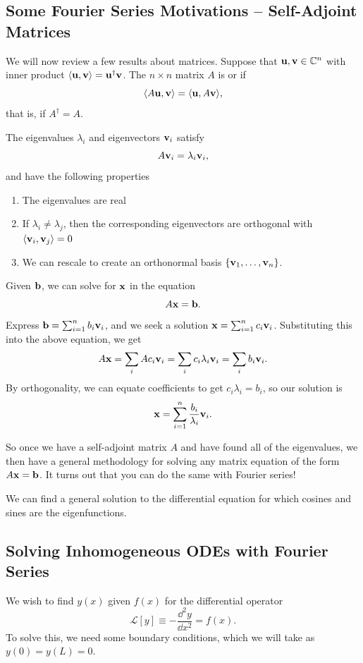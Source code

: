 \documentclass[a4paper]{scrartcl}
\begin{document}
\subsection{Some Fourier Series Motivations -- Self-Adjoint Matrices}

We will now review a few results about matrices. Suppose that $\mathbf{u}, \mathbf{v} \in \mathbb{C}^n$ with inner product $\langle \mathbf{u}, \mathbf{v}\rangle = \mathbf{u}^\dagger \mathbf{v}$.
The $n \times n$ matrix $A$ is  or  if
$$
\langle A \mathbf{u}, \mathbf{v}\rangle = \langle \mathbf{u}, A \mathbf{v}\rangle,
$$
that is, if $A^\dagger = A$.

The eigenvalues $\lambda_i$ and eigenvectors $\mathbf{v}_i$ satisfy
$$
A \mathbf{v}_i = \lambda_i \mathbf{v}_i,
$$
and have the following properties
\begin{enumerate}[label=(\roman*)]
    \item The eigenvalues are real
    \item If $\lambda_i \neq \lambda_j$, then the corresponding eigenvectors are orthogonal with $\langle \mathbf{v}_i, \mathbf{v}_j\rangle = 0$
    \item We can rescale to create an orthonormal basis $\{\mathbf{v}_1, \dots, \mathbf{v}_n\}$.
\end{enumerate}

Given $\mathbf{b}$, we can solve for $\mathbf{x}$ in the equation
$$
A \mathbf{x} = \mathbf{b}.
$$
Express $\mathbf{b} = \sum_{i = 1}^n b_i \mathbf{v}_i$, and we seek a solution $\mathbf{x} = \sum_{i = 1}^n c_i \mathbf{v}_i$. Substituting this into the above equation, we get
$$
A \mathbf{x} = \sum_{i} A c_i \mathbf{v}_i = \sum_{i} c_i \lambda_i \mathbf{v}_i = \sum_{i} b_i \mathbf{v}_i.
$$
By orthogonality, we can equate coefficients to get $c_i \lambda_i = b_i$, so our solution is
$$
\mathbf{x} = \sum_{i = 1}^n \frac{b_i}{\lambda_i} \mathbf{v}_i.
$$

So once we have a self-adjoint matrix $A$ and have found all of the eigenvalues, we then have a general methodology for solving any matrix equation of the form $A \mathbf{x} = \mathbf{b}$. It turns out that you can do the same with Fourier series!

We can find a general solution to the differential equation for which cosines and sines are the eigenfunctions.

\subsection{Solving Inhomogeneous ODEs with Fourier Series}

We wish to find $y(x)$ given $f(x)$ for the differential operator
$$
\mathcal{L}[y] \equiv -\frac{\dd^2 y}{\dd x^2} = f(x).
$$
To solve this, we need some boundary conditions, which we will take as $y(0) = y(L) = 0$.
\end{document}
